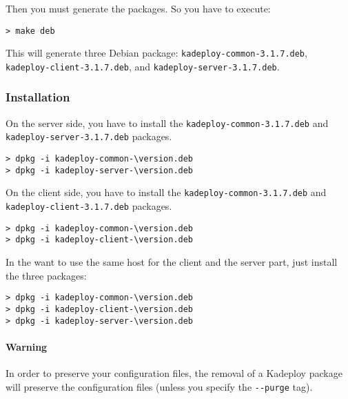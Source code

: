 \documentclass[a4wide,10pt,oneside]{book}
\newcommand{\version}{3.1.7}
\begin{document}
\noindent Then you must generate the packages. So you have to execute:
\begin{small}
\begin{verbatim}
> make deb
\end{verbatim}
\end{small}
This will generate three Debian package: \texttt{kadeploy-common-\version.deb}, \texttt{kadeploy-client-\version.deb}, and \texttt{kadeploy-server-\version.deb}.
\subsubsection{Installation}
\noindent On the server side, you have to install the \texttt{kadeploy-common-\version.deb} and \texttt{kadeploy-server-\version.deb} packages.
\begin{small}
\begin{Verbatim}[commandchars=\\\{\}]
> dpkg -i kadeploy-common-\version.deb
> dpkg -i kadeploy-server-\version.deb
\end{Verbatim}
\end{small}

\noindent On the client side, you have to install the \texttt{kadeploy-common-\version.deb} and \texttt{kadeploy-client-\version.deb} packages.
\begin{small}
\begin{Verbatim}[commandchars=\\\{\}]
> dpkg -i kadeploy-common-\version.deb
> dpkg -i kadeploy-client-\version.deb
\end{Verbatim}
\end{small}

\noindent In the want to use the same host for the client and the server part, just install the three packages:
\begin{small}
\begin{Verbatim}[commandchars=\\\{\}]
> dpkg -i kadeploy-common-\version.deb
> dpkg -i kadeploy-client-\version.deb
> dpkg -i kadeploy-server-\version.deb
\end{Verbatim}
\end{small}

\paragraph{Warning}
In order to preserve your configuration files, the removal of a Kadeploy package will preserve the configuration files (unless you specify the \texttt{-{}-purge} tag).
\end{document}
